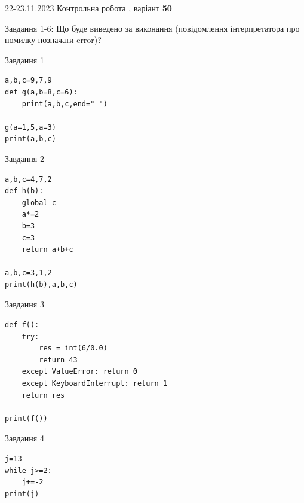 \documentclass[12pt, ukrainian]{article}
\begin{document}
{{22-23.11.2023 Контрольна робота , варіант  \No \textbf { 50 }\par}}
{

Завдання 1-6: Що буде виведено за виконання (повідомлення інтерпретатора про помилку позначати error)?


\begin{minipage}[t]{9.7cm}                
{\begin{center}Завдання {1}\end{center}}
\begin{verbatim}
a,b,c=9,7,9
def g(a,b=8,c=6):
    print(a,b,c,end=" ")

g(a=1,5,a=3)
print(a,b,c)
\end{verbatim}     
\end{minipage}
\vline \hspace{8mm}
\begin{minipage}[t]{8.0cm}                
{\begin{center}Завдання {2}\end{center}}
\begin{verbatim}
a,b,c=4,7,2
def h(b):
    global c
    a*=2
    b=3
    c=3
    return a+b+c

a,b,c=3,1,2
print(h(b),a,b,c)
\end{verbatim}     
\end{minipage}

\vspace{15mm}
\begin{minipage}[t]{9.7cm}                
{\begin{center}Завдання {3}\end{center}}
\begin{verbatim}
def f():
    try:
        res = int(6/0.0)
        return 43
    except ValueError: return 0
    except KeyboardInterrupt: return 1
    return res

print(f())
\end{verbatim}     
\end{minipage}
\vline \hspace{8mm}
\begin{minipage}[t]{8.0cm}                
{\begin{center}Завдання {4}\end{center}}
\begin{verbatim}
j=13
while j>=2:
    j+=-2
print(j)
\end{verbatim}     
\end{minipage}

}
\end{document}
